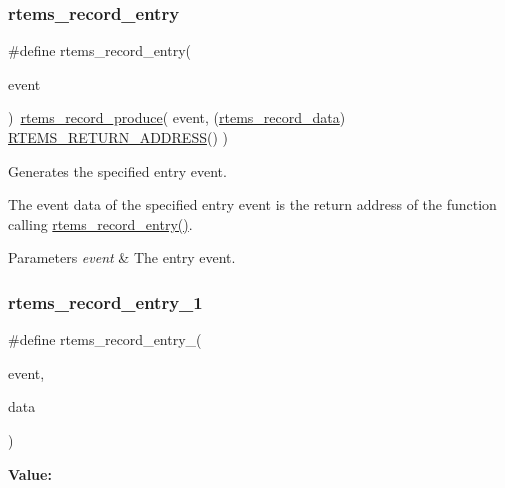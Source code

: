 \subsubsection{\texorpdfstring{rtems\_record\_entry}{rtems\_record\_entry}}
{\footnotesize\ttfamily \#define rtems\+\_\+record\+\_\+entry(\begin{DoxyParamCaption}\item[{}]{event }\end{DoxyParamCaption})~\mbox{\hyperlink{group__RTEMSRecord_ga136d81367324d6729819192181ea68bb}{rtems\+\_\+record\+\_\+produce}}( event, (\mbox{\hyperlink{group__RTEMSRecord_gab483bd3ec735835dac6788b78c817eab}{rtems\+\_\+record\+\_\+data}}) \mbox{\hyperlink{group__RTEMSScoreBaseDefs_ga70a1b8869a1ec49d30613af22ebc3f50}{R\+T\+E\+M\+S\+\_\+\+R\+E\+T\+U\+R\+N\+\_\+\+A\+D\+D\+R\+E\+SS}}() )}



Generates the specified entry event. 

The event data of the specified entry event is the return address of the function calling \mbox{\hyperlink{group__RTEMSRecord_gaebb24b5708bdc53200069ecace1be042}{rtems\+\_\+record\+\_\+entry()}}.


\begin{DoxyParams}{Parameters}
{\em event} & The entry event. \\
\hline
\end{DoxyParams}
\mbox{\label{group__RTEMSRecord_ga9344d5b82305235c0616959f1cb147c6}} 
\subsubsection{\texorpdfstring{rtems\_record\_entry\_1}{rtems\_record\_entry\_1}}
{\footnotesize\ttfamily \#define rtems\+\_\+record\+\_\+entry\+\_(\begin{DoxyParamCaption}\item[{}]{event,  }\item[{}]{data }\end{DoxyParamCaption})}

{\bfseries Value\+:}
\begin{DoxyCode}{0}
\DoxyCodeLine{  )}

\end{DoxyCode}


